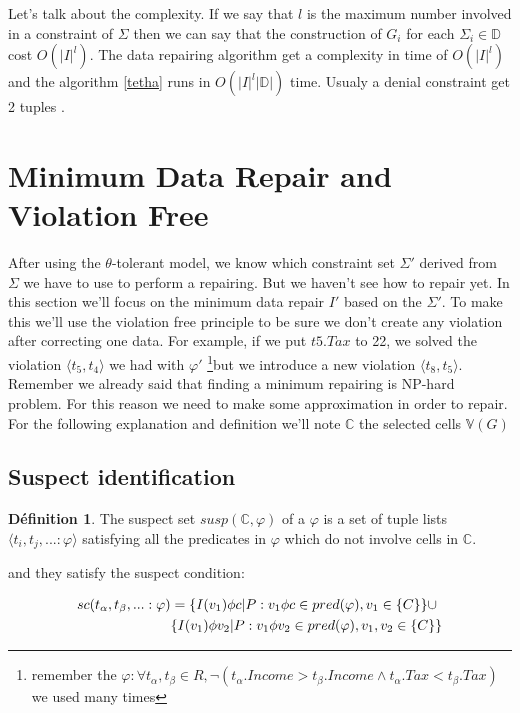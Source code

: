 \documentclass[letterpaper, 12pt]{report}
\theoremstyle{definition}
\newtheorem{mydef}{Définition}
\begin{document}
Let's talk about the complexity. If we say that $l$ is the maximum number involved in a constraint of $\Sigma$ then we can say that the construction of $G_i$ for each $\Sigma_i \in \mathbb{D}$ cost $O(|I|^l)$. The data repairing algorithm get a complexity in time of $O(|I|^l)$ and the algorithm \ref{tetha} runs in $O(|I|^l|\mathbb{D}|)$ time. Usualy a denial constraint get 2 tuples \cite{main}.

\section{Minimum Data Repair and Violation Free}

After using the $\theta$-tolerant model, we know which constraint set $\Sigma'$ derived from $\Sigma$ we have to use to perform a repairing. But we haven't see how to repair yet. In this section we'll focus on the minimum data repair $I'$ based on the $\Sigma'$. To make this we'll use the violation free principle to be sure we don't create any violation after correcting one data. For example, if we put $t5.Tax$ to 22, we solved the violation $ \langle t_5,t_4 \rangle$ we had with $\varphi'$ \footnote{remember the $\varphi: \forall t_\alpha,t_\beta \in R , \neg(t_\alpha.Income > t_\beta.Income \wedge t_\alpha.Tax < t_\beta.Tax)$ we used many times}but we introduce a new violation $\langle t_8,t_5 \rangle$.\\

Remember we already said that finding a minimum repairing is NP-hard problem. For this reason we need to make some approximation in order to repair. For the following explanation and definition we'll note $\mathbb{C}$ the selected cells $\mathbb{V}(G)$

\subsection{Suspect identification}

\begin{mydef} \cite{main}
	The suspect set $susp(\mathbb{C},\varphi)$ of a $\varphi$ is a set of tuple lists $\langle t_i,t_j,...:\varphi \rangle$ satisfying all the predicates in $\varphi$ which do not involve cells in $\mathbb{C}$.
\end{mydef}

and they satisfy the suspect condition:

\begin{displaymath}
\begin{split}
sc(t_\alpha,t_\beta,...:\varphi) &= \{I(v_1)\phi c| P: v_1 \phi c \in pred(\varphi),v_1 \in \mathbb\{C\}\}\cup \\
	&\{I(v_1)\phi v_2| P: v_1 \phi v_2 \in pred(\varphi),v_1,v_2 \in \mathbb\{C\}\}
\end{split}
\end{displaymath}
\end{document}
